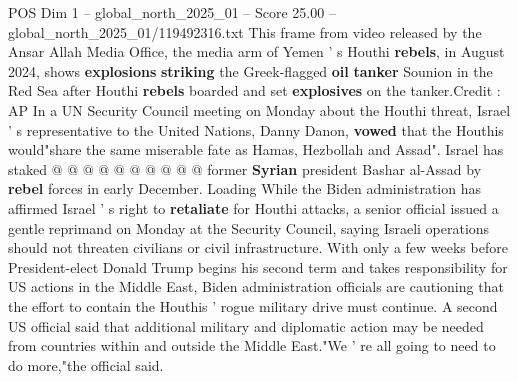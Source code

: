 \begin{textsample}{POS Dim 1 – global\_north\_2025\_01 – Score 25.00 – global\_north\_2025\_01/119492316.txt}
This frame from video released by the Ansar Allah Media Office, the media arm of Yemen ' s Houthi \textbf{rebels}, in August 2024, shows \textbf{explosions} \textbf{striking} the Greek-flagged \textbf{oil} \textbf{tanker} Sounion in the Red Sea after Houthi \textbf{rebels} boarded and set \textbf{explosives} on the tanker.Credit : AP In a UN Security Council meeting on Monday about the Houthi threat, Israel ' s representative to the United Nations, Danny Danon, \textbf{vowed} that the Houthis would"share the same miserable fate as Hamas, Hezbollah and Assad".
Israel has staked @ @ @ @ @ @ @ @ @ @ former \textbf{Syrian} president Bashar al-Assad by \textbf{rebel} forces in early December.
Loading While the Biden administration has affirmed Israel ' s right to \textbf{retaliate} for Houthi attacks, a senior official issued a gentle reprimand on Monday at the Security Council, saying Israeli operations should not threaten civilians or civil infrastructure.
With only a few weeks before President-elect Donald Trump begins his second term and takes responsibility for US actions in the Middle East, Biden administration officials are cautioning that the effort to contain the Houthis ' rogue military drive must continue.
A second US official said that additional military and diplomatic action may be needed from countries within and outside the Middle East."We ' re all going to need to do more,"the official said.

\end{textsample}
